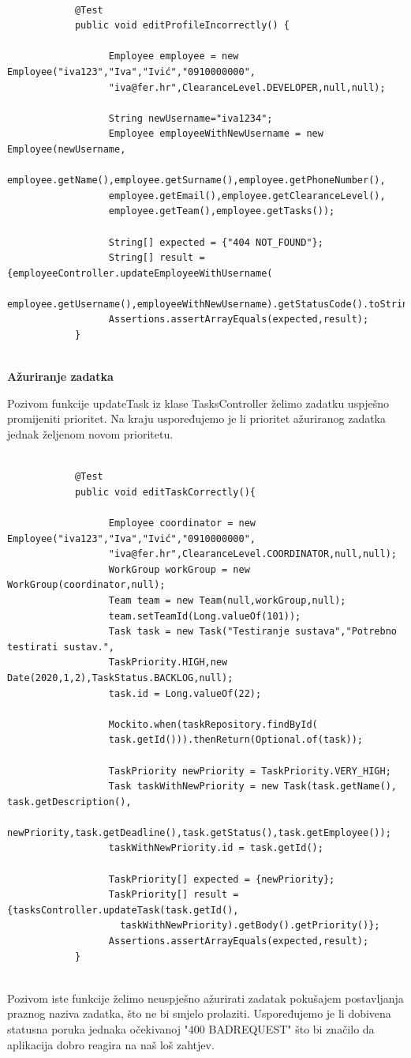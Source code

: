 		\begin{verbatim}
			
			@Test
			public void editProfileIncorrectly() {
				  
				  Employee employee = new Employee("iva123","Iva","Ivić","0910000000",
				  "iva@fer.hr",ClearanceLevel.DEVELOPER,null,null);
				
				  String newUsername="iva1234";
				  Employee employeeWithNewUsername = new Employee(newUsername,
				  employee.getName(),employee.getSurname(),employee.getPhoneNumber(),
				  employee.getEmail(),employee.getClearanceLevel(),
				  employee.getTeam(),employee.getTasks());
				
				  String[] expected = {"404 NOT_FOUND"};
				  String[] result = {employeeController.updateEmployeeWithUsername(
					  employee.getUsername(),employeeWithNewUsername).getStatusCode().toString()};
				  Assertions.assertArrayEquals(expected,result);
			}
			
		\end{verbatim}
		\textbf{Ažuriranje zadatka}
		
		Pozivom funkcije updateTask iz klase TasksController želimo zadatku uspješno promijeniti prioritet. Na kraju uspoređujemo je li prioritet ažuriranog zadatka jednak željenom novom prioritetu.
		\begin{verbatim}
			
			@Test
			public void editTaskCorrectly(){
				  
				  Employee coordinator = new Employee("iva123","Iva","Ivić","0910000000",
				  "iva@fer.hr",ClearanceLevel.COORDINATOR,null,null);
				  WorkGroup workGroup = new WorkGroup(coordinator,null);
				  Team team = new Team(null,workGroup,null);
				  team.setTeamId(Long.valueOf(101));
				  Task task = new Task("Testiranje sustava","Potrebno testirati sustav.",
				  TaskPriority.HIGH,new Date(2020,1,2),TaskStatus.BACKLOG,null);
				  task.id = Long.valueOf(22);
				
				  Mockito.when(taskRepository.findById(
				  task.getId())).thenReturn(Optional.of(task));
				
				  TaskPriority newPriority = TaskPriority.VERY_HIGH;
				  Task taskWithNewPriority = new Task(task.getName(), task.getDescription(),
				  newPriority,task.getDeadline(),task.getStatus(),task.getEmployee());
				  taskWithNewPriority.id = task.getId();
				
				  TaskPriority[] expected = {newPriority};
				  TaskPriority[] result = {tasksController.updateTask(task.getId(),
					taskWithNewPriority).getBody().getPriority()};
				  Assertions.assertArrayEquals(expected,result);
			}
			
		\end{verbatim}
		Pozivom iste funkcije želimo neuspješno ažurirati zadatak pokušajem postavljanja praznog naziva zadatka, što ne bi smjelo prolaziti. Uspoređujemo je li dobivena statusna poruka jednaka očekivanoj "400 BAD\textunderscore REQUEST" što bi značilo da aplikacija dobro reagira na naš loš zahtjev.
		
